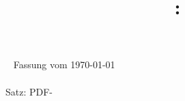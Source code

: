 \documentclass{diplom-mi-eng}
\title{\projectName: \projectSubline}
\begin{document}
\renewcommand{\contentsname}{Inhaltsverzeichnis}
\frontmatter %

\maketitle	%

\clearpage
\thispagestyle{empty}
{	\small\sffamily
	\flushleft
	~\vfill
	Fassung vom \today\\[1cm]
	\copyrightinfo\\[.5cm]	%
	Satz: PDF-\LaTeXe
}





\tableofcontents

\mainmatter %

























\appendix		%


\backmatter %

\listoffigures	%
\listoftables	%

%


\cleardoublepage
\clearscrheadfoot
\end{document}
